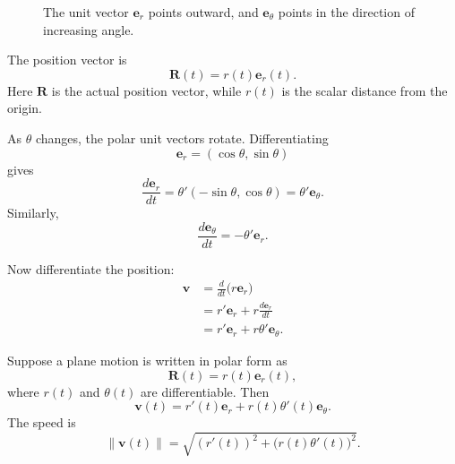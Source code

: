 \begin{figure}[h]
\centering
{}
\caption{The unit vector \(\mathbf e_r\) points outward, and \(\mathbf e_\theta\) points
in the direction of increasing angle.}
\end{figure}

The position vector is
\[
    \mathbf R(t)=r(t)\mathbf e_r(t).
\]
Here \(\mathbf R\) is the actual position vector, while \(r(t)\) is the scalar distance from
the origin.

As \(\theta\) changes, the polar unit vectors rotate.  Differentiating
\[
    \mathbf e_r=(\cos\theta,\sin\theta)
\]
gives
\[
    \frac{d\mathbf e_r}{dt}
    =
    \theta'(-\sin\theta,\cos\theta)
    =
    \theta'\mathbf e_\theta.
\]
Similarly,
\[
    \frac{d\mathbf e_\theta}{dt}
    =
    -\theta'\mathbf e_r.
\]

Now differentiate the position:
\[
\begin{aligned}
    \mathbf v
    &=
    \frac{d}{dt}\bigl(r\mathbf e_r\bigr)\\
    &=
    r'\mathbf e_r+r\frac{d\mathbf e_r}{dt}\\
    &=
    r'\mathbf e_r+r\theta'\mathbf e_\theta.
\end{aligned}
\]

\begin{theorem}
Suppose a plane motion is written in polar form as
\[
    \mathbf R(t)=r(t)\mathbf e_r(t),
\]
where \(r(t)\) and \(\theta(t)\) are differentiable.  Then
\[
\boxed{
    \mathbf v(t)=r'(t)\mathbf e_r+r(t)\theta'(t)\mathbf e_\theta.
}
\]
The speed is
\[
\boxed{
    \|\mathbf v(t)\|=
    \sqrt{(r'(t))^2+\bigl(r(t)\theta'(t)\bigr)^2}.
}
\]
\end{theorem}

